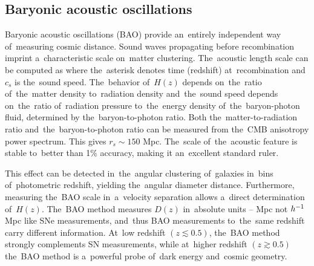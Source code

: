 \subsection[Baryonic acoustic oscillations]{Baryonic acoustic oscillations}
\label{sec:bao}
Baryonic acoustic oscillations (BAO) provide an~entirely independent way of~measuring cosmic distance. Sound waves propagating before recombination imprint a~characteristic scale on~matter clustering. The~acoustic length scale can be computed as
where the~asterisk denotes time (redshift) at~recombination and~$c_s$ is the~sound speed. The~behavior of~$H(z)$ depends on~the~ratio of~the~matter density to~radiation density and~the~sound speed depends on~the~ratio of~radiation pressure to~the~energy density of~the~baryon-photon fluid, determined by the~baryon-to-photon ratio. Both the~matter-to-radiation ratio and~the~baryon-to-photon ratio can be measured from the~CMB anisotropy power spectrum. This gives $r_s\sim150$ Mpc. The~scale of~the~acoustic feature is stable to~better than 1\% accuracy, making it an~excellent standard ruler.

This effect can be detected in~the~angular clustering of~galaxies in~bins of~photometric redshift, yielding the~angular diameter distance. Furthermore, measuring the~BAO scale in~a~velocity separation allows a~direct determination of~$H(z)$. The~BAO method measures $D(z)$ in~absolute units -- Mpc not $h^{-1}$ Mpc like SNe measurements, and~thus BAO measurements to~the~same redshift carry different information. At~low redshift $(z\lesssim0.5)$, the~BAO method strongly complements SN measurements, while at~higher redshift $(z\gtrsim0.5)$ the~BAO method is a~powerful probe of~dark energy and~cosmic geometry.

